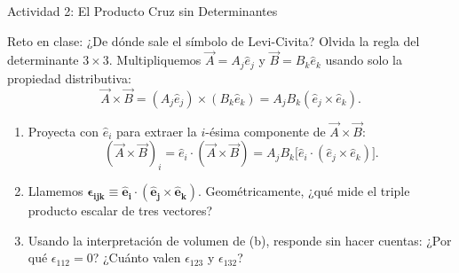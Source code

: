 \documentclass[10pt,aspectratio=169]{beamer}
\begin{document}
\begin{frame}{Actividad 2: El Producto Cruz sin Determinantes}
  \begin{block}{Reto en clase: ¿De dónde sale el símbolo de Levi-Civita?}
    \small
    Olvida la regla del determinante $3 \times 3$. Multipliquemos $\vec{A} = A_j\hat{e}_j$ y $\vec{B} = B_k\hat{e}_k$ usando solo la propiedad distributiva:
    \[
    \vec{A} \times \vec{B} = (A_j\hat{e}_j) \times (B_k\hat{e}_k) = A_j B_k (\hat{e}_j \times \hat{e}_k).
    \]
    \begin{enumerate}
      \item[(a)] Proyecta con $\hat{e}_i$ para extraer la $i$-ésima componente de $\vec{A}\times\vec{B}$:
      \[
      (\vec{A}\times\vec{B})_i = \hat{e}_i \cdot (\vec{A}\times\vec{B}) = A_j B_k \big[\hat{e}_i \cdot (\hat{e}_j \times \hat{e}_k)\big].
      \]
      \item[(b)] Llamemos $\mathbf{\epsilon_{ijk} \equiv \hat{e}_i \cdot (\hat{e}_j \times \hat{e}_k)}$. Geométricamente, ¿qué mide el triple producto escalar de tres vectores?
      \item[(c)] Usando la interpretación de volumen de (b), responde sin hacer cuentas: ¿Por qué $\epsilon_{112} = 0$? ¿Cuánto valen $\epsilon_{123}$ y $\epsilon_{132}$?
    \end{enumerate}
  \end{block}
\end{frame}
\end{document}
